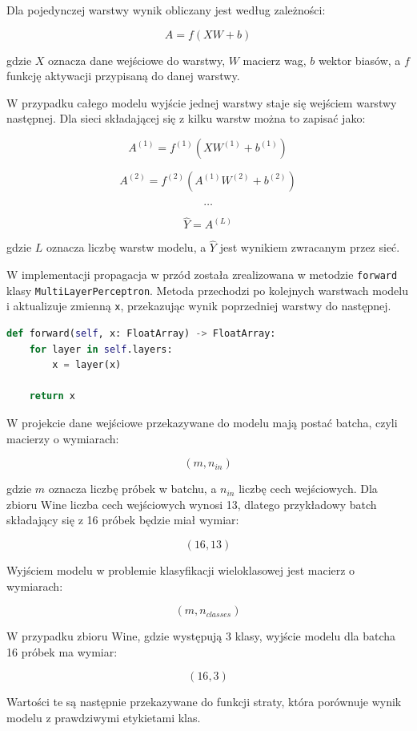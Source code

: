 Dla pojedynczej warstwy wynik obliczany jest według zależności:

\[
    A = f(XW + b)
\]

\begin{flushleft}
gdzie \(X\) oznacza dane wejściowe do warstwy, \(W\) macierz wag,
\(b\) wektor biasów, a \(f\) funkcję aktywacji przypisaną do danej warstwy.

W przypadku całego modelu wyjście jednej warstwy staje się wejściem warstwy
następnej. Dla sieci składającej się z kilku warstw można to zapisać jako:
\end{flushleft}

\[
    A^{(1)} = f^{(1)}(XW^{(1)} + b^{(1)})
\]

\[
    A^{(2)} = f^{(2)}(A^{(1)}W^{(2)} + b^{(2)})
\]

\[
    \ldots
\]

\[
    \hat{Y} = A^{(L)}
\]

gdzie \(L\) oznacza liczbę warstw modelu, a \(\hat{Y}\) jest wynikiem
zwracanym przez sieć.

\begin{flushleft}
W implementacji propagacja w przód została zrealizowana w metodzie
\texttt{forward} klasy \texttt{MultiLayerPerceptron}. Metoda przechodzi po
kolejnych warstwach modelu i aktualizuje zmienną \texttt{x}, przekazując
wynik poprzedniej warstwy do następnej.
\end{flushleft}

\begin{lstlisting}[language=Python, caption={Fragment kodu pokazujący definicje propagacji w przód dla całej sieci.}, label={lst:forward}, basicstyle=\ttfamily\small, breaklines=true, frame=single]
def forward(self, x: FloatArray) -> FloatArray:
    for layer in self.layers:
        x = layer(x)

    return x
\end{lstlisting}

\break

\begin{flushleft}
W projekcie dane wejściowe przekazywane do modelu mają postać batcha, czyli
macierzy o wymiarach:

\[
    (m, n_{in})
\]

gdzie \(m\) oznacza liczbę próbek w batchu, a \(n_{in}\) liczbę cech
wejściowych. Dla zbioru Wine liczba cech wejściowych wynosi 13, dlatego
przykładowy batch składający się z 16 próbek będzie miał wymiar:

\[
    (16, 13)
\]

Wyjściem modelu w problemie klasyfikacji wieloklasowej jest macierz o wymiarach:

\[
    (m, n_{classes})
\]

W przypadku zbioru Wine, gdzie występują 3 klasy, wyjście modelu dla batcha 16 próbek ma wymiar:

\[
    (16, 3)
\]

Wartości te są następnie przekazywane do funkcji straty, która porównuje
wynik modelu z prawdziwymi etykietami klas.
\end{flushleft}

